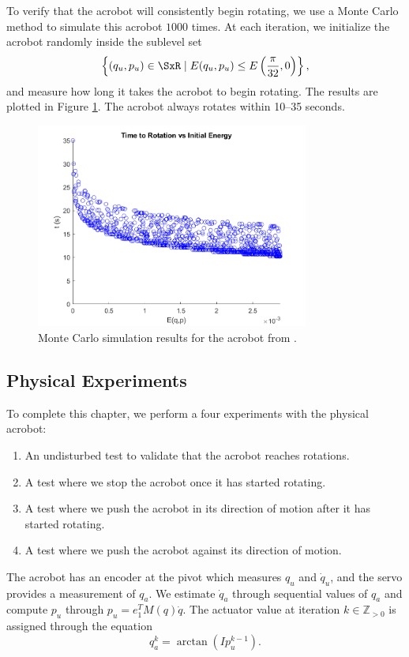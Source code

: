 To verify that the acrobot will consistently begin rotating, we use a Monte
Carlo method \cite{montecarlo} to simulate this
acrobot \(1000\) times.
At each iteration, we initialize the acrobot randomly inside the sublevel set
\[
    \left\{(q_u,p_u) \in \SxR \mid
    E(q_u,p_u) \leq E\left(\frac{\pi}{32},0\right)\right\}
    ,
\] 
and measure how long it takes the acrobot to begin rotating.
The results are plotted in Figure \ref{fig:acrobot-mc}.
The acrobot always rotates within 10--35 seconds.

\begin{figure}
    \centering
    \includegraphics[width=0.8\textwidth]{images/acrobot_mc.png}
    \caption{Monte Carlo simulation results for the acrobot from
    \cite{xingbo_thesis}.}
    \label{fig:acrobot-mc}
\end{figure}

\subsection{Physical Experiments}
To complete this chapter, we perform a four experiments with the physical
acrobot:
\begin{enumerate}
    \item An undisturbed test to validate that the acrobot reaches rotations.
    \item A test where we stop the acrobot once it has started rotating.
    \item A test where we push the acrobot in its direction of motion after it has
        started rotating.
    \item A test where we push the acrobot against its direction of motion.
\end{enumerate}

The acrobot has an encoder at the pivot which measures \(q_u\) and
\(\dot{q}_u\), and the servo provides a measurement of \(q_a\).
We estimate \(\dot{q}_a\) through sequential values of \(q_a\) and
compute \(p_u\) through \(p_u = e_1^T M(q) \dot{q}\).
The actuator value at iteration \(k \in \mathbb{Z}_{> 0}\) is assigned through
the equation
\[
    q_a^{k} = \arctan(I p_u^{k-1})
    .
\]

